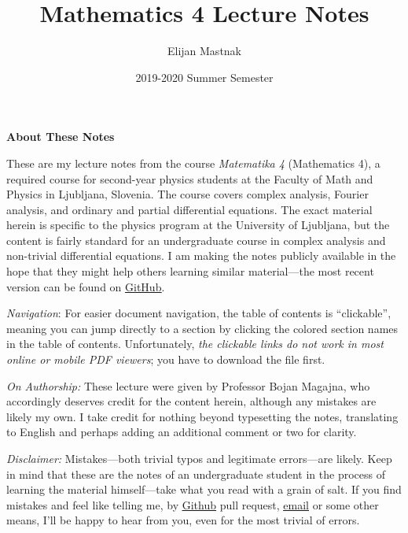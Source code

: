 \documentclass[11pt, a4paper]{article}
\begin{document}
\title{Mathematics 4 Lecture Notes}
\author{Elijan Mastnak}
\date{2019-2020 Summer Semester}
\maketitle

\begin{center}
\textbf{About These Notes}
\end{center}
These are my lecture notes from the course \textit{Matematika 4} (Mathematics 4), a required course for second-year physics students at the Faculty of Math and Physics in Ljubljana, Slovenia. The course covers complex analysis, Fourier analysis, and ordinary and partial differential equations. The exact material herein is specific to the physics program at the University of Ljubljana, but the content is fairly standard for an undergraduate course in complex analysis and non-trivial differential equations. I am making the notes publicly available in the hope that they might help others learning similar material---the most recent version can be found on \href{https://github.com/ejmastnak/fmf/tree/main/math-4}{\underline{GitHub}}.

\vspace{2mm}
\textit{Navigation}: For easier document navigation, the table of contents is ``clickable'', meaning you can jump directly to a section by clicking the colored section names in the table of contents. Unfortunately, \textit{the clickable links do not work in most online or mobile PDF viewers}; you have to download the file first.


\vspace{2mm}
\textit{On Authorship:} These lecture were given by Professor Bojan Magajna, who accordingly deserves credit for the content herein, although any mistakes are likely my own. I take credit for nothing beyond typesetting the notes, translating to English and perhaps adding an additional comment or two for clarity.



\vspace{2mm}
\textit{Disclaimer:} Mistakes---both trivial typos and legitimate errors---are likely. Keep in mind that these are the notes of an undergraduate student in the process of learning the material himself---take what you read with a grain of salt. If you find mistakes and feel like telling me, by \href{https://github.com/ejmastnak/fmf}{\underline{Github}} pull request, \href{mailto:ejmastnak@gmail.com}{\underline{email}} or some other means, I'll be happy to hear from you, even for the most trivial of errors.
\end{document}
